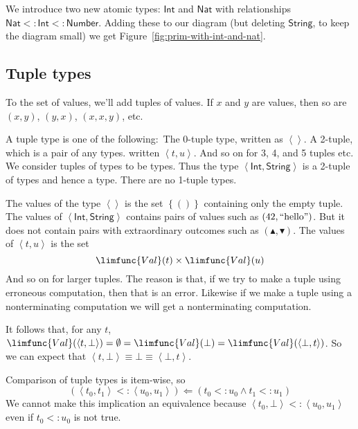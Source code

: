 \documentclass[12pt]{article}
\begin{document}
We introduce two new atomic types: $\mathsf{Int}$ and $\mathsf{Nat}$ with
relationships $\mathsf{Nat}<:\mathsf{Int}<:\mathsf{Number}$. Adding these to
our diagram (but deleting $\mathsf{String}$, to keep the diagram small) we
get Figure~\ref{fig:prim-with-int-and-nat}.

\subsection{Tuple types}

To the set of values, we'll add tuples of values. If $x$ and $y$ are values,
then so are $\left( x,y\right) $, $\left( y,x\right) $, $\left( x,x,y\right) 
$, etc.

A tuple type is one of the following:\ The 0-tuple type, written as $%
\left\langle {}\right\rangle $. A 2-tuple, which is a pair of any types.
written $\left\langle t,u\right\rangle $. And so on for 3, 4, and 5 tuples
etc. We consider tuples of types to be types. Thus the type $\left\langle 
\mathsf{Int},\mathsf{String}\right\rangle $ is a 2-tuple of types and hence
a type. There are no 1-tuple types.

The values of the type $\left\langle {}\right\rangle $ is the set $\left\{
()\right\} $ containing only the empty tuple. The values of $\left\langle 
\mathsf{Int},\mathsf{String}\right\rangle $ contains pairs of values such as 
$\left( 42,\text{\textquotedblleft hello\textquotedblright }\right) $. But
it does not contain pairs with extraordinary outcomes such as $\left(
\blacktriangle ,\blacktriangledown \right) $. The values of $\left\langle
t,u\right\rangle $ is the set 
\begin{equation*}
\limfunc{Val}(t)\times \limfunc{Val}(u\mathsf{)}
\end{equation*}%
And so on for larger tuples. The reason is that, if we try to make a tuple
using erroneous computation, then that is an error. Likewise if we make a
tuple using a nonterminating computation we will get a nonterminating
computation.

It follows that, for any $t$, $\limfunc{Val}(\left\langle t,\bot
\right\rangle )=\emptyset =\limfunc{Val}(\bot )=\limfunc{Val}(\left\langle
\bot ,t\right\rangle )$. So we can expect that $\left\langle t,\bot
\right\rangle \equiv \bot \equiv \left\langle \bot ,t\right\rangle $.

Comparison of tuple types is item-wise, so%
\begin{equation*}
\left( \left\langle t_{0},t_{1}\right\rangle <:\left\langle
u_{0},u_{1}\right\rangle \right) \Leftarrow \left( t_{0}<:u_{0}\wedge
t_{1}<:u_{1}\right)
\end{equation*}%
We cannot make this implication an equivalence because $\left\langle
t_{0},\bot \right\rangle <:\left\langle u_{0},u_{1}\right\rangle $ even if $%
t_{0}<:u_{0}$ is not true.
\end{document}
